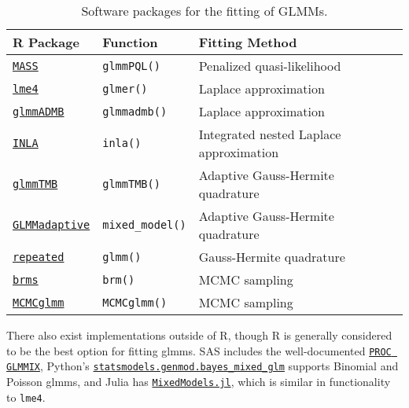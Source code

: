 \documentclass{report}
\begin{document}
\begin{table}[h!]
\centering
\begin{tabular}{||l l l||} 
 \hline
 \textbf{R Package} & \textbf{Function} & \textbf{Fitting Method} \\ [0.5ex] 
  \hline\hline
  \href{https://cran.r-project.org/web/packages/MASS/index.html}{\texttt{MASS}} & \texttt{glmmPQL()} & Penalized quasi-likelihood \\ 
  \hline
  \href{https://cran.r-project.org/web/packages/lme4/index.html}{\texttt{lme4}} & \texttt{glmer()} & Laplace approximation \\
  \hline
  \href{http://glmmadmb.r-forge.r-project.org}{\texttt{glmmADMB}} & \texttt{glmmadmb()} & Laplace approximation \\
  \hline
  \href{https://www.r-inla.org}{\texttt{INLA}} & \texttt{inla()} & Integrated nested Laplace approximation \\ 
  \hline
  \href{https://cran.r-project.org/web/packages/glmmTMB/index.html}{\texttt{glmmTMB}} & \texttt{glmmTMB()} & Adaptive Gauss-Hermite quadrature \\
  \hline
  \href{https://cran.r-project.org/web/packages/GLMMadaptive/index.html}{\texttt{GLMMadaptive}} & \texttt{mixed\_model()} & Adaptive Gauss-Hermite quadrature \\
  \hline
  \href{https://cran.r-project.org/web/packages/repeated/index.html}{\texttt{repeated}} & \texttt{glmm()} & Gauss-Hermite quadrature \\
  \hline 
  \href{https://cran.r-project.org/web/packages/brms/index.html}{\texttt{brms}} & \texttt{brm()} & MCMC sampling \\
  \hline
  \href{https://cran.r-project.org/web/packages/MCMCglmm/index.html}{\texttt{MCMCglmm}} & \texttt{MCMCglmm()} & MCMC sampling \\
  \hline
\end{tabular}
\caption{Software packages for the fitting of GLMMs.}
\label{table:glmm-software}
\end{table}

There also exist implementations outside of R, though R is generally considered to be the best option for fitting \glspl{glmm}. SAS includes the well-documented \href{https://support.sas.com/documentation/cdl/en/statug/63033/HTML/default/viewer.htm#glimmix_toc.htm}{\texttt{PROC GLMMIX}}, Python's \href{https://www.statsmodels.org/stable/mixed_glm.html}{\texttt{statsmodels.genmod.bayes\_mixed\_glm}} supports Binomial and Poisson \glspl{glmm}, and Julia has \href{https://juliastats.org/MixedModels.jl/stable/}{\texttt{MixedModels.jl}}, which is similar in functionality to \texttt{lme4}.  
\end{document}
